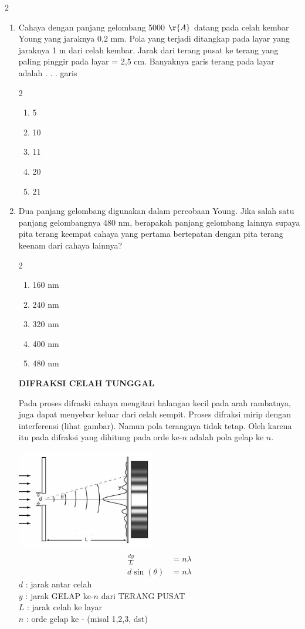 \documentclass[10pt,a4paper]{extarticle}
\newcommand{\pilgani}[1]{                            \vspace{-0.3cm}\begin{multicols}{2}
 \begin{enumerate}[label=\Alph*., itemsep=0pt,topsep=0pt,leftmargin=*,align=Center]#1                     \end{enumerate}
 \phantom{ini cuma sapi, wedus, dan ayam}
 \end{multicols}}
\begin{document}
\begin{multicols*}{2}
\begin{enumerate}
\item Cahaya dengan panjang gelombang 5000 $\r{A}$ datang pada celah kembar Young yang jaraknya 0,2 mm. Pola yang terjadi ditangkap pada layar yang jaraknya 1 m dari celah kembar. Jarak dari terang pusat ke terang yang paling pinggir pada layar = 2,5 cm. Banyaknya garis terang pada layar adalah . . . garis
\pilgani{
        \item 5
        \item 10
        \item 11
        \item 20
        \item 21
        }

\vspace{2cm} \item Dua panjang gelombang digunakan dalam percobaan Young. Jika salah satu panjang gelombangnya 480 nm, berapakah panjang gelombang lainnya supaya pita terang keempat cahaya yang pertama bertepatan dengan pita terang keenam dari cahaya lainnya?  \pilgani{
        \item 160 nm
        \item 240 nm
        \item 320 nm
       \item 400 nm
        \item 480 nm
} \vspace{3cm} 


\textbf{DIFRAKSI CELAH TUNGGAL}

Pada proses difraski cahaya mengitari halangan kecil pada arah rambatnya, juga dapat menyebar keluar dari celah sempit. Proses difraksi mirip dengan interferensi (lihat gambar). Namun pola terangnya tidak tetap. Oleh karena itu pada difraksi yang dihitung pada orde ke-$n$ adalah pola gelap ke $n$. 

\includegraphics[width=6cm]{pic/singleslit}
\begin{align*}
\frac{dy}{L} &= n \lambda\\
d \sin (\theta) &= n \lambda
\end{align*}
$d$ : jarak antar celah\\
$y$ : jarak GELAP ke-$n$ dari TERANG PUSAT\\
$L$ : jarak celah ke layar\\ 
$n$ : orde gelap ke - (misal 1,2,3, dst)\\




\end{enumerate}
\end{multicols*}
\end{document}

